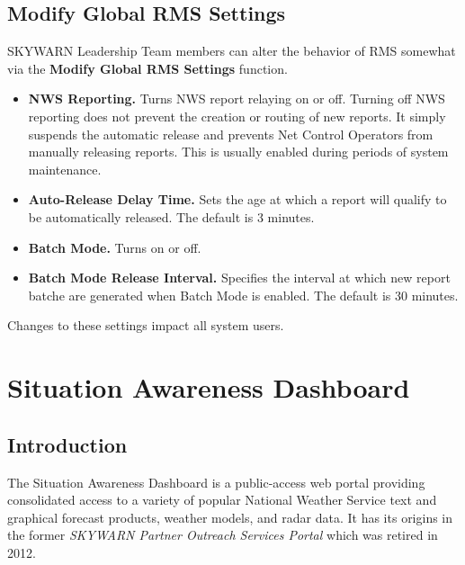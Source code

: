 \documentclass[pdflatex,letterpaper,twoside,12pt]{book}
\begin{document}
\section{Modify Global RMS Settings}\label{dash-rms-settings}

SKYWARN Leadership Team members can alter the behavior of RMS somewhat via the \textbf{Modify Global RMS Settings} function.

\begin{itemize}
\item \textbf{NWS Reporting.}  Turns NWS report relaying on or off.  Turning off NWS reporting does not prevent the creation or routing of new reports.  It simply suspends the automatic release and prevents Net Control Operators from manually releasing reports.  This is usually enabled during periods of system maintenance.
\item \textbf{Auto-Release Delay Time.}  Sets the age at which a report will qualify to be automatically released.  The default is 3 minutes.
\item \textbf{Batch Mode.}  Turns  on or off.
\item \textbf{Batch Mode Release Interval.}  Specifies the interval at which new report batche are generated when Batch Mode is enabled.  The default is 30 minutes.
\end{itemize}

Changes to these settings impact all system users.


\chapter{Situation Awareness Dashboard}\label{sit-dashboard}

\section{Introduction}

The Situation Awareness Dashboard is a public-access web portal providing consolidated access to a variety of popular National Weather Service text and graphical forecast products, weather models, and radar data.  It has its origins in the former \emph{SKYWARN Partner Outreach Services Portal} which was retired in 2012.
\end{document}
